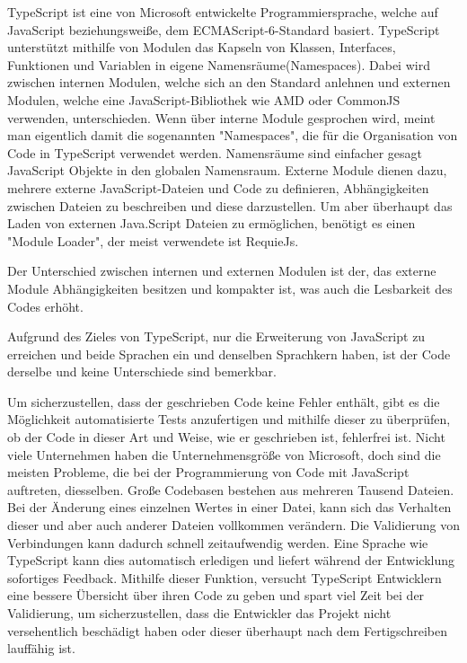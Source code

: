 \label{sec:TypeScript}

TypeScript ist eine von Microsoft entwickelte Programmiersprache, welche auf JavaScript beziehungsweiße, dem ECMAScript-6-Standard basiert. TypeScript unterstützt mithilfe von Modulen das Kapseln von Klassen, Interfaces, Funktionen und Variablen in eigene Namensräume(Namespaces). Dabei wird zwischen internen Modulen, welche sich an den Standard anlehnen und externen Modulen, welche eine JavaScript-Bibliothek wie AMD oder CommonJS verwenden, unterschieden. Wenn über interne Module gesprochen wird, meint man eigentlich damit die sogenannten "Namespaces", die für die Organisation von Code in TypeScript verwendet werden. Namensräume sind einfacher gesagt JavaScript Objekte in den globalen Namensraum. Externe Module dienen dazu, mehrere externe JavaScript-Dateien und Code zu definieren, Abhängigkeiten zwischen Dateien zu beschreiben und diese darzustellen. Um aber überhaupt das Laden von externen Java.Script Dateien zu ermöglichen, benötigt es einen "Module Loader", der meist verwendete ist RequieJs.

Der Unterschied zwischen internen und externen Modulen ist der, das externe Module Abhängigkeiten besitzen und kompakter ist, was auch die Lesbarkeit des Codes erhöht.

\cite{TypeScript}\cite{IntModules}\cite{ExtModules}



Aufgrund des Zieles von TypeScript, nur die Erweiterung von JavaScript zu erreichen und beide Sprachen ein und denselben Sprachkern haben, ist der Code derselbe und keine Unterschiede sind bemerkbar. 
\cite{TypeScript}


Um sicherzustellen, dass der geschrieben Code keine Fehler enthält, gibt es die Möglichkeit automatisierte Tests anzufertigen und mithilfe dieser zu überprüfen, ob der Code in dieser Art und Weise, wie er geschrieben ist, fehlerfrei ist.
Nicht viele Unternehmen haben die Unternehmensgröße von Microsoft, doch sind die meisten Probleme, die bei der Programmierung von Code mit JavaScript auftreten, diesselben. Große Codebasen bestehen aus mehreren Tausend Dateien. Bei der Änderung eines einzelnen Wertes in einer Datei, kann sich das Verhalten dieser und aber auch anderer Dateien vollkommen verändern.
Die Validierung von Verbindungen kann dadurch schnell zeitaufwendig werden. Eine Sprache wie TypeScript kann dies automatisch erledigen und liefert während der Entwicklung sofortiges Feedback. Mithilfe dieser Funktion, versucht TypeScript Entwicklern eine bessere Übersicht über ihren Code zu geben und spart viel Zeit bei der Validierung, um sicherzustellen, dass die Entwickler das Projekt nicht versehentlich beschädigt haben oder dieser überhaupt nach dem Fertigschreiben lauffähig ist.

\cite{ScriptWiki}
